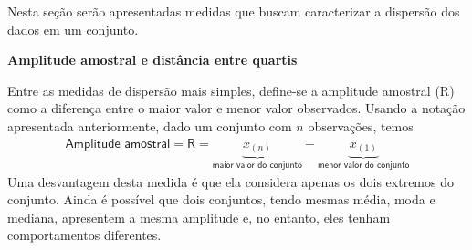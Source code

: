 Nesta seção serão apresentadas medidas que buscam caracterizar a dispersão dos dados em um conjunto.

\textbf{Amplitude amostral e distância entre quartis}

Entre as medidas de dispersão mais simples, define-se a amplitude amostral (R) como a diferença entre o maior valor e menor valor observados. Usando a notação apresentada anteriormente, dado um conjunto com \(n\) observações, temos
\begin{equation*}
\begin{split}\textsf{Amplitude amostral}=\textsf{R}= \underbrace{x_{(n)}}_{\textsf{maior valor do conjunto}}-\underbrace{x_{(1)}}_{\textsf{menor valor do conjunto}}\end{split}
\end{equation*}
Uma desvantagem desta medida é que ela considera apenas os dois extremos do conjunto. Ainda é possível que dois conjuntos, tendo mesmas média, moda e mediana, apresentem a mesma amplitude e, no entanto, eles tenham comportamentos diferentes. 

